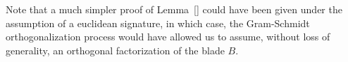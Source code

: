 \documentclass{birkjour}
\theoremstyle{definition}
\theoremstyle{remark}
\numberwithin{equation}{section}
\begin{document}
Note that a much simpler proof of Lemma~\ref{} could have been given under the assumption of a euclidean signature,
in which case, the Gram-Schmidt orthogonalization process would have allowed us to assume, without loss
of generality, an orthogonal factorization of the blade $B$.


\begin{thebibliography}{9}

\end{thebibliography}
\end{document}
